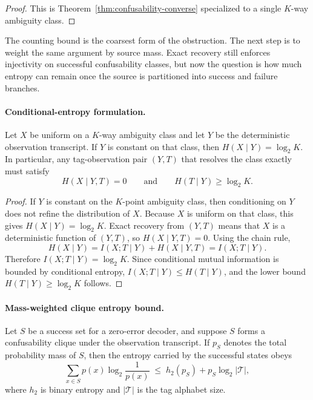 \begin{proof}
This is Theorem~\ref{thm:confusability-converse} specialized to a single $K$-way ambiguity class.
\end{proof}

The counting bound is the coarsest form of the obstruction. The next step is to weight the same argument by source mass. Exact recovery still enforces injectivity on successful confusability classes, but now the question is how much entropy can remain once the source is partitioned into success and failure branches.

\paragraph{Conditional-entropy formulation.}
Let $X$ be uniform on a $K$-way ambiguity class and let $Y$ be the deterministic observation transcript. If $Y$ is constant on that class, then $H(X\mid Y)=\log_2 K$. In particular, any tag-observation pair $(Y,T)$ that resolves the class exactly must satisfy
\[
H(X\mid Y,T)=0
\qquad\text{and}\qquad
H(T\mid Y)\ge \log_2 K .
\]

\begin{proof}
If $Y$ is constant on the $K$-point ambiguity class, then conditioning on $Y$ does not refine the distribution of $X$. Because $X$ is uniform on that class, this gives $H(X\mid Y)=\log_2 K$. Exact recovery from $(Y,T)$ means that $X$ is a deterministic function of $(Y,T)$, so $H(X\mid Y,T)=0$. Using the chain rule,
\[
H(X\mid Y)=I(X;T\mid Y)+H(X\mid Y,T)=I(X;T\mid Y).
\]
Therefore $I(X;T\mid Y)=\log_2 K$. Since conditional mutual information is bounded by conditional entropy, $I(X;T\mid Y)\le H(T\mid Y)$, and the lower bound $H(T\mid Y)\ge \log_2 K$ follows.
\end{proof}

\paragraph{Mass-weighted clique entropy bound.}
Let $S$ be a success set for a zero-error decoder, and suppose $S$ forms a confusability clique under the observation transcript. If $p_S$ denotes the total probability mass of $S$, then the entropy carried by the successful states obeys
\[
\sum_{x\in S} p(x)\log_2 \frac{1}{p(x)}
\;\le\;
h_2(p_S) + p_S \log_2 |\mathcal T|,
\]
where $h_2$ is binary entropy and $|\mathcal T|$ is the tag alphabet size.

